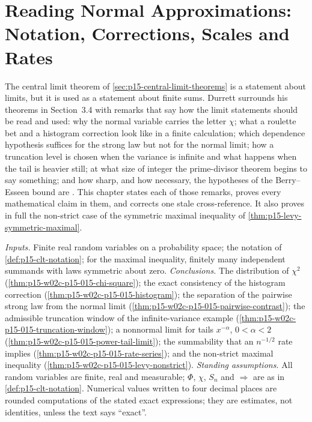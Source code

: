\chapter{Reading Normal Approximations: Notation, Corrections, Scales and Rates}
\label{sec:p15-w02c-p15-015-reading}

The central limit theorem of \cref{sec:p15-central-limit-theorems} is
a statement about limits, but it is used as a statement about finite
sums. Durrett surrounds his theorems in Section~3.4 with remarks that
say how the limit statements should be read and used: why the normal
variable carries the letter \(\chi\); what a roulette bet and a
histogram correction look like in a finite calculation; which
dependence hypothesis suffices for the strong law but not for the
normal limit; how a truncation level is chosen when the variance is
infinite and what happens when the tail is heavier still; at what size
of integer the prime-divisor theorem begins to say something; and how
sharp, and how necessary, the hypotheses of the Berry--Esseen bound are
\cite[Section~3.4, pp.~144--157]{DurrettPTEAuthor2019}. This chapter
states each of those remarks, proves every mathematical claim in them,
and corrects one stale cross-reference. It also proves in full the
non-strict case of the symmetric maximal inequality of
\cref{thm:p15-levy-symmetric-maximal}.

\emph{Inputs.} Finite real random variables on a probability space; the
notation of \cref{def:p15-clt-notation}; for the maximal inequality,
finitely many independent summands with laws symmetric about zero.
\emph{Conclusions.} The distribution of \(\chi^2\)
(\cref{thm:p15-w02c-p15-015-chi-square}); the exact consistency of the
histogram correction (\cref{thm:p15-w02c-p15-015-histogram}); the
separation of the pairwise strong law from the normal limit
(\cref{thm:p15-w02c-p15-015-pairwise-contrast}); the admissible
truncation window of the infinite-variance example
(\cref{thm:p15-w02c-p15-015-truncation-window}); a nonnormal limit for
tails \(x^{-\alpha}\), \(0<\alpha<2\)
(\cref{thm:p15-w02c-p15-015-power-tail-limit}); the summability that
an \(n^{-1/2}\) rate implies (\cref{thm:p15-w02c-p15-015-rate-series});
and the non-strict maximal inequality
(\cref{thm:p15-w02c-p15-015-levy-nonstrict}).
\emph{Standing assumptions.} All random variables are finite, real and
measurable; \(\Phi\), \(\chi\), \(S_n\) and \(\Rightarrow\) are as in
\cref{def:p15-clt-notation}. Numerical values written to four decimal
places are rounded computations of the stated exact expressions; they
are estimates, not identities, unless the text says ``exact''.

